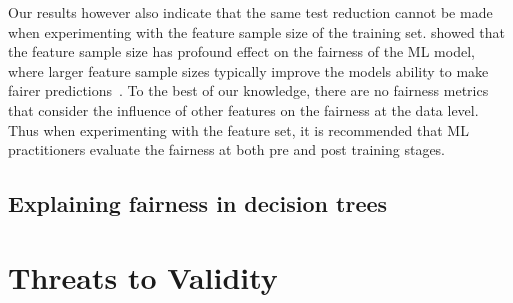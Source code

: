 \documentclass{article}
\begin{document}

Our results however also indicate that the same test reduction cannot
be made when experimenting with the feature sample size of the
training set. \citeauthor{zhang2021ignorance} showed that the feature
sample size has profound effect on the fairness of the ML model, where
larger feature sample sizes typically improve the models ability to
make fairer predictions \cite{zhang2021ignorance}. To the best of our
knowledge, there are no fairness metrics that consider the influence
of other features on the fairness at the data level. Thus when
experimenting with the feature set, it is recommended that ML
practitioners evaluate the fairness at both pre and post training
stages.



\subsection{Explaining fairness in decision trees}\label{sec:discuss-explain-fair-dt}



\section{Threats to Validity}\label{sec:threats}
\end{document}
